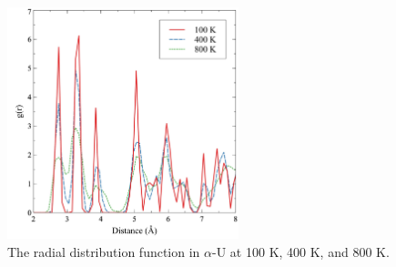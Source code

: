 \documentclass[utf8]{frontiersSCNS} %
\begin{document}
 \begin{figure}[hbt]
	\centering
	\includegraphics[width=0.6\textwidth]{rdfs.jpg}
  \caption{The radial distribution function in $\alpha$-U at 100 K, 400 K, and 800 K. }\label{fig:rdf}
\end{figure}
\end{document}
